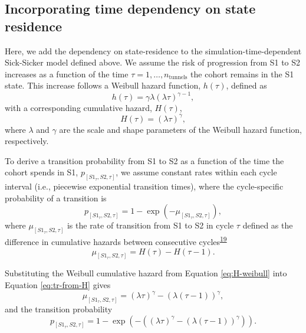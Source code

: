 \documentclass[
]{article}
\begin{document}
\hypertarget{incorporating-time-dependency-on-state-residence}{%
\subsection{Incorporating time dependency on state residence}\label{incorporating-time-dependency-on-state-residence}}

Here, we add the dependency on state-residence to the simulation-time-dependent Sick-Sicker model defined above. We assume the risk of progression from S1 to S2 increases as a function of the time \(\tau = 1, \ldots, n_{\text{tunnels}}\) the cohort remains in the S1 state. This increase follows a Weibull hazard function, \(h(\tau)\), defined as
\[
  h(\tau) = \gamma \lambda (\lambda \tau)^{\gamma-1},
\]
with a corresponding cumulative hazard, \(H(\tau)\),
\begin{equation}
  H(\tau) = (\lambda \tau)^{\gamma},
\label{eq:H-weibull}
\end{equation}
where \(\lambda\) and \(\gamma\) are the scale and shape parameters of the Weibull hazard function, respectively.

To derive a transition probability from S1 to S2 as a function of the time the cohort spends in S1, \(p_{\left[S1_{\tau},S2, \tau\right]}\), we assume constant rates within each cycle interval (i.e., piecewise exponential transition times), where the cycle-specific probability of a transition is
\begin{equation}
  p_{\left[S1_{\tau},S2, \tau\right]} = 1-\exp{\left(-\mu_{\left[S1_{\tau},S2, \tau\right]}\right)},
\label{eq:tp-from-rate}
\end{equation}
where \(\mu_{\left[S1_{\tau},S2, \tau\right]}\) is the rate of transition from S1 to S2 in cycle \(\tau\) defined as the difference in cumulative hazards between consecutive cycles\textsuperscript{\protect\hyperlink{ref-Diaby2014}{19}}
\begin{equation}
  \mu_{\left[S1_{\tau},S2, \tau\right]} = H(\tau) - H(\tau-1).
\label{eq:tr-from-H}
\end{equation}

Substituting the Weibull cumulative hazard from Equation \eqref{eq:H-weibull} into Equation \eqref{eq:tr-from-H} gives
\begin{equation}
  \mu_{\left[S1_{\tau},S2, \tau\right]} = (\lambda \tau)^{\gamma} - (\lambda (\tau-1))^{\gamma},
\label{eq:tr-from-H-weibull}
\end{equation}
and the transition probability
\begin{equation}
  p_{\left[S1_{\tau},S2, \tau\right]} = 1-\exp{\left(- \left((\lambda \tau)^{\gamma} - (\lambda (\tau-1))^{\gamma}\right) \right)}.
\label{eq:tp-from-H-weibull}
\end{equation}
\end{document}
